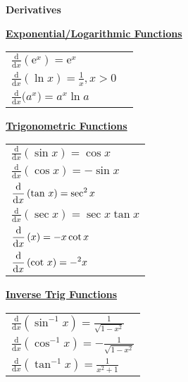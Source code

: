 \documentclass[11pt,a4paper]{book}
\let\csc\relax
\DeclareMathOperator{\csc}{cosec}
\begin{document}
\tableofcontents


\newpage

\thispagestyle{plain}

\begin{sidewaysfigure}

\begin{minipage}[t]{0.3\textwidth}
\begin{center}
\textbf{\Large{}Derivatives}{\Large\par}
\par\end{center}
\textbf{\large{}\uline{Exponential/Logarithmic Functions}}{\large\par}
\setlength{\extrarowheight}{0.35cm}
\begin{tabular}{>{\raggedright}p{3.5cm}>{\raggedright}p{6cm}}
${\displaystyle \frac{\mathrm{d}}{\mathrm{d}x}\left(\mathrm{e}^{x}\right)=\mathrm{e}^{x}}$\tabularnewline
${\displaystyle \frac{\mathrm{d}}{\mathrm{d}x}\left(\ln x\right)=\frac{1}{x},x>0}$
\tabularnewline
${\displaystyle \frac{\mathrm{d}}{\mathrm{d}x}(}a^{x})=a^{x}\ln a$ & \tabularnewline
\end{tabular}

\vspace{0.5cm}

\textbf{\large{}\uline{Trigonometric Functions}}{\large\par}
\begin{tabular}{>{\raggedright}p{6cm}}
${\displaystyle \frac{\mathrm{d}}{\mathrm{d}x}\left(\sin x\right)=\cos x}$\tabularnewline
${\displaystyle \frac{\mathrm{d}}{\mathrm{d}x}\left(\cos x\right)=-\sin x}$\tabularnewline
${\displaystyle \frac{\mathrm{d}}{\mathrm{d}x}\left(\tan\thinspace x\right)=\sec^{2}x}$\tabularnewline
${\displaystyle \frac{\mathrm{d}}{\mathrm{d}x}\left(\sec x\right)=\sec x\tan x}$\tabularnewline
${\displaystyle \frac{\mathrm{d}}{\mathrm{d}x}\left(\csc x\right)=-\csc x\cot x}$\tabularnewline
${\displaystyle \frac{\mathrm{d}}{\mathrm{d}x}\left(\cot\thinspace x\right)=-\csc^{2}x}$\tabularnewline
\end{tabular}

\vspace{0.5cm}

\textbf{\large{}\uline{Inverse Trig Functions}}{\large\par}

\begin{tabular}{>{\raggedright}p{6cm}}
${\displaystyle \frac{\mathrm{d}}{\mathrm{d}x}\left(\sin^{-1}x\right)=\frac{1}{\sqrt{1-x^{2}}}}$\tabularnewline
${\displaystyle \frac{\mathrm{d}}{\mathrm{d}x}\left(\cos^{-1}x\right)=-\frac{1}{\sqrt{1-x^{2}}}}$\tabularnewline
${\displaystyle \frac{\mathrm{d}}{\mathrm{d}x}\left(\tan^{-1}x\right)=\frac{1}{x^{2}+1}}$\tabularnewline
\end{tabular}


\end{minipage}
\end{sidewaysfigure}
\end{document}
